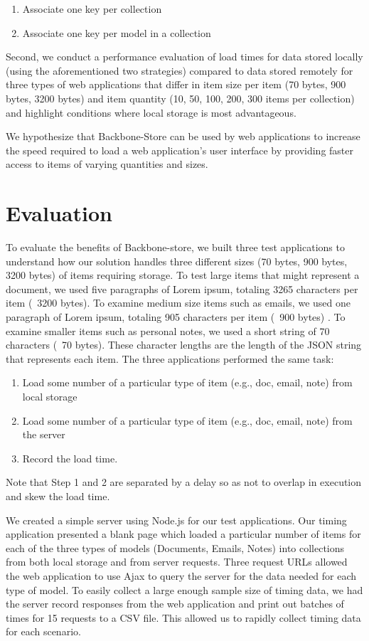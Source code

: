 \documentclass[12pt]{article}
\begin{document}
\begin{enumerate}
\item Associate one key per collection
\item Associate one key per model in a collection
\end{enumerate}

Second, we conduct a performance evaluation of load times for data
stored locally (using the aforementioned two strategies) compared to data
stored remotely for three types of web applications that differ in item size
per item (70 bytes, 900 bytes, 3200 bytes) and item quantity (10, 50, 100, 200,
300 items per collection) and highlight conditions where local storage is most
advantageous.

We hypothesize that Backbone-Store can be used by web applications to increase the speed required to load a web application's user interface by providing faster access to items of varying quantities and sizes.

\section{Evaluation}

To evaluate the benefits of Backbone-store, we built three test applications to
understand how our solution handles three different sizes (70 bytes, 900 bytes, 3200 bytes) of items requiring
storage. To test large items that might represent a document, we used five
paragraphs of Lorem ipsum, totaling 3265 characters per item (~3200 bytes). To examine
medium size items such as emails, we used one paragraph of Lorem ipsum,
totaling 905 characters per item (~900 bytes) . To examine smaller items such as personal
notes, we used a short string of 70 characters (~70 bytes). These character lengths are the
length of the JSON string that represents each item. The three applications
performed the same task: 
\begin{enumerate}
\item Load some number of a particular type of item (e.g., doc, email, note) from
local storage
\item Load some number of a particular type of item (e.g., doc, email, note) from the server
\item Record the load time.
\end{enumerate}

Note that Step 1 and 2 are separated by a delay so as not to overlap in
execution and skew the load time.

We created a simple server using Node.js \cite{node} for our test applications. Our timing
application presented a blank page which loaded a particular number of items
for each of the three types of models (Documents, Emails, Notes) into collections from both local storage
and from server requests. Three request URLs allowed the web application to use
Ajax to query the server for the data needed for each type of model. To easily
collect a large enough sample size of timing data, we had the server record
responses from the web application and print out batches of times for 15
requests to a CSV file. This allowed us to rapidly collect timing data for each
scenario.
\end{document}
